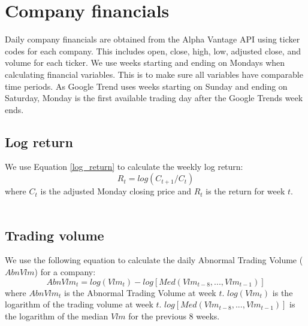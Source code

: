 \section{Company financials}
Daily company financials are obtained from the Alpha Vantage API using ticker codes for each company. This includes open, close, high, low, adjusted close, and volume for each ticker. We use weeks starting and ending on Mondays when calculating financial variables. This is to make sure all variables have comparable time periods. As Google Trend uses weeks starting on Sunday and ending on Saturday, Monday is the first available trading day after the Google Trends week ends. 
\subsection*{Log return}
We use Equation \eqref{log_return} to calculate the weekly log return:
\begin{equation}
   \label{log_return} 
   R_t = log (C_{t+1}/C_{t}) 
\end{equation}
where $C_{t}$ is the adjusted Monday closing price and $R_{t}$ is the return for week $t$.
\\\\
\subsection*{Trading volume}
We use the following equation to calculate the daily Abnormal Trading Volume ($AbnVlm$) for a company: 
\begin{equation}
   \label{abnormal_volume} 
   AbnVlm_{t} = log(Vlm_{t}) - log[Med(Vlm_{t-8},...,Vlm_{t-1})] 
\end{equation}
   where $AbnVlm_t$ is the Abnormal Trading Volume at week $t$. $log(Vlm_{t})$ is the logarithm of the trading volume at week $t$. $log[Med(Vlm_{t-8},...,Vlm_{t-1})]$ is the logarithm of the median $Vlm$ for the previous 8 weeks.
